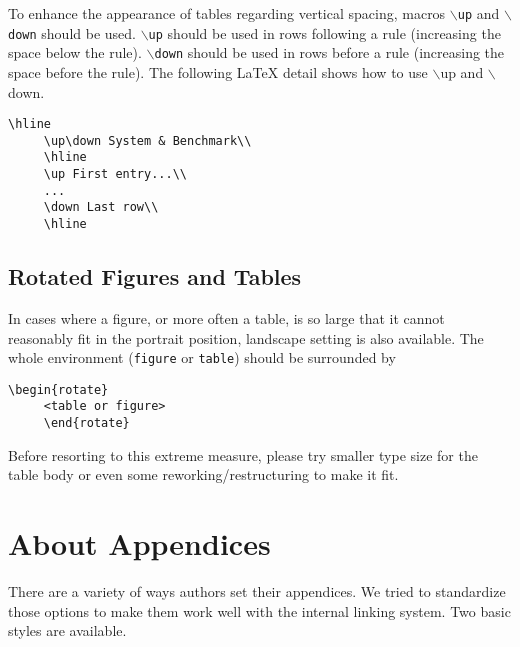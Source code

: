 \documentclass[ijds,nonblindrev]{informs4}
\begin{document}
To enhance the appearance of tables regarding vertical spacing,
macros \texttt{$\backslash $up} and \texttt{$\backslash $down} should be used.  
\texttt{$\backslash $up} should be used in rows following a rule 
(increasing the space below the rule). \texttt{$\backslash $down}
should be used in rows before a rule (increasing the space before the rule). 
The following LaTeX detail shows how to use $\backslash $up and $\backslash $down.
\begin{Verbatim}[fontsize=\small]
     \hline
     \up\down System & Benchmark\\ 
     \hline
     \up First entry...\\
     ...
     \down Last row\\
     \hline
\end{Verbatim}

\subsection{Rotated Figures and Tables}\label{sec9.3}

In cases where a figure, or more often a table, is so large that it cannot 
reasonably fit in the portrait position, landscape setting is also 
available. The whole environment (\texttt{figure} or \texttt{table}) should be surrounded by
\begin{Verbatim}[fontsize=\small]
     \begin{rotate}
     <table or figure>
     \end{rotate}
\end{Verbatim}

\noindent
Before resorting to this extreme measure, please try smaller type size for 
the table body or even some reworking/restructuring to make it fit.

\section{About Appendices}\label{sec10}

There are a variety of ways authors set their appendices. We tried to 
standardize those options to make them work well with the internal linking 
system. Two basic styles are available.
\end{document}
